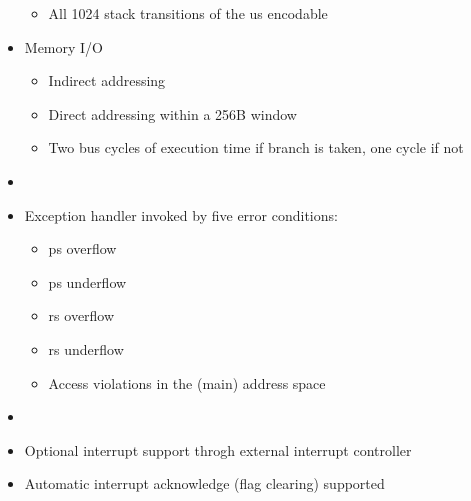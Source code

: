 \begin{description}[style=nextline]
\begin{itemize}
    \begin{itemize}
      \item All 1024 stack transitions of the \gls{us} encodable
    \end{itemize}
  \item Memory I/O
    \begin{itemize}
    \item Indirect addressing
    \item Direct addressing within a 256B window
    \item Two bus cycles of execution time if branch is taken, one cycle if not
    \end{itemize}   
  \end{itemize}

\item[Exceptions:]
  \begin{itemize}
  \item[]
  \item Exception handler invoked by five error conditions:
    \begin{itemize}
    \item \Gls{ps} overflow
    \item \Gls{ps} underflow
    \item \Gls{rs} overflow
    \item \Gls{rs} underflow
    \item Access violations in the (main) address space
    \end{itemize}
  \end{itemize}
    
\item[Interrupts:]
  \begin{itemize}
  \item[]
  \item Optional interrupt support throgh external interrupt controller
  \item Automatic interrupt acknowledge (flag clearing) supported
  \end{itemize}
  
\end{description}
